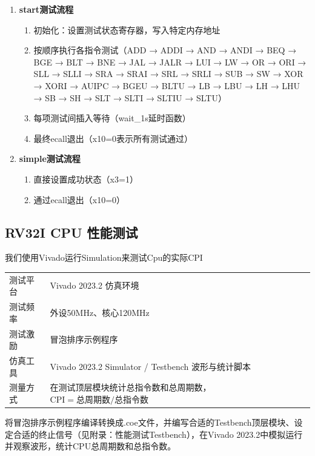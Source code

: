 \documentclass[12pt,a4paper]{ctexart}
\begin{document}
\begin{enumerate}
    \item \textbf{start测试流程}
    \begin{enumerate}
        \item 初始化：设置测试状态寄存器，写入特定内存地址
        \item 按顺序执行各指令测试（ADD → ADDI → AND → ANDI → BEQ → BGE → BLT → BNE → JAL → JALR → LUI → LW → OR → ORI → SLL → SLLI → SRA → SRAI → SRL → SRLI → SUB → SW → XOR → XORI → AUIPC → BGEU → BLTU → LB → LBU → LH → LHU → SB → SH → SLT → SLTI → SLTIU → SLTU）
        \item 每项测试间插入等待（wait\_1s延时函数）
        \item 最终ecall退出（x10=0表示所有测试通过）
    \end{enumerate}
    
    \item \textbf{simple测试流程}
    \begin{enumerate}
        \item 直接设置成功状态（x3=1）
        \item 通过ecall退出（x10=0）
    \end{enumerate}
\end{enumerate}

\subsection{RV32I CPU 性能测试}

我们使用Vivado运行Simulation来测试Cpu的实际CPI

\begin{table}[H]
\centering
\scriptsize
\begin{tabularx}{\textwidth}{p{2cm}p{12cm}X}
    \toprule
    \midrule
    测试平台 & Vivado 2023.2 仿真环境 \\
    测试频率 & 外设50MHz、核心120MHz \\
    测试激励 & 冒泡排序示例程序 \\
    仿真工具 & Vivado 2023.2 Simulator / Testbench 波形与统计脚本 \\
    测量方式 & 在测试顶层模块统计总指令数和总周期数，$\text{CPI} = \text{总周期数}/\text{总指令数}$ \\
    \bottomrule
\end{tabularx}
\end{table}

将冒泡排序示例程序编译转换成.coe文件，并编写合适的Testbench顶层模块、设定合适的终止信号（见附录：性能测试Testbench），在Vivado 2023.2中模拟运行并观察波形，统计CPU总周期数和总指令数。
\end{document}
